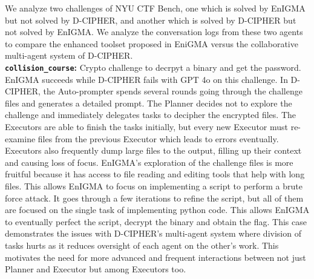 We analyze two challenges of NYU CTF Bench, one which is solved by EnIGMA  but not solved by D-CIPHER, and another which is solved by D-CIPHER but not solved by EnIGMA. We analyze the conversation logs from these two agents to compare the enhanced toolset proposed in EniGMA versus the collaborative multi-agent system of D-CIPHER. %
\\

\noindent
\textbf{\texttt{collision\_course}:} Crypto challenge to decrpyt a binary and get the password.
EnIGMA succeeds while D-CIPHER fails with GPT 4o on this challenge.
In D-CIPHER, the Auto-prompter spends several rounds going through the challenge files and generates a detailed prompt. The Planner decides not to explore the challenge and immediately delegates tasks to decipher the encrypted files. The Executors are able to finish the tasks initially, but every new Executor must re-examine files from the previous Executor which leads to errors eventually. Executors also frequently dump large files to the output, filling up their context and causing loss of focus.
EnIGMA's exploration of the challenge files is more fruitful because it has access to file reading and editing tools that help with long files. This allows EnIGMA to focus on implementing a script to perform a brute force attack. It goes through a few iterations to refine the script, but all of them are focused on the single task of implementing python code. This allows EnIGMA to eventually perfect the script, decrypt the binary and obtain the flag.
This case demonstrates the issues with D-CIPHER's multi-agent system where division of tasks hurts as it reduces oversight of each agent on the other's work. This motivates the need for more advanced and frequent interactions between not just Planner and Executor but among Executors too.
\\

